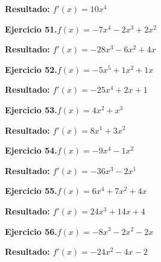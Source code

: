 \documentclass[10pt,a4paper]{article}
\begin{document}
\begin{solbox}
\textbf{Resultado:} \(\displaystyle f'(x) = 10x^{4}\)
\end{solbox}

\begin{ejbox}
\textbf{Ejercicio 51.}\quad $f(x) = -7x^4 -2x^3 +2x^2$
\end{ejbox}

\begin{solbox}
\textbf{Resultado:} \(\displaystyle f'(x) = -28x^3 -6x^2 +4x\)
\end{solbox}

\newpage
\begin{ejbox}
\textbf{Ejercicio 52.}\quad $f(x) = -5x^{5} +1x^2 +1x$
\end{ejbox}

\begin{solbox}
\textbf{Resultado:} \(\displaystyle f'(x) = -25x^{4} +2x +1\)
\end{solbox}

\begin{ejbox}
\textbf{Ejercicio 53.}\quad $f(x) = 4x^{2} + x^{3}$
\end{ejbox}

\begin{solbox}
\textbf{Resultado:} \(\displaystyle f'(x) = 8x^{1} + 3x^{2}\)
\end{solbox}

\begin{ejbox}
\textbf{Ejercicio 54.}\quad $f(x) = -9x^{4} -1x^{2}$
\end{ejbox}

\begin{solbox}
\textbf{Resultado:} \(\displaystyle f'(x) = -36x^{3} -2x^{1}\)
\end{solbox}

\newpage
\begin{ejbox}
\textbf{Ejercicio 55.}\quad $f(x) = 6x^{4} +7x^2 +4x$
\end{ejbox}

\begin{solbox}
\textbf{Resultado:} \(\displaystyle f'(x) = 24x^{3} +14x +4\)
\end{solbox}

\begin{ejbox}
\textbf{Ejercicio 56.}\quad $f(x) = -8x^3 -2x^2 -2x$
\end{ejbox}

\begin{solbox}
\textbf{Resultado:} \(\displaystyle f'(x) = -24x^2 -4x -2\)
\end{solbox}
\end{document}
